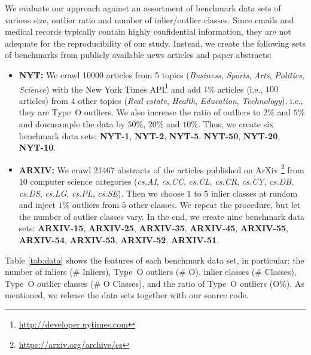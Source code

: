 We evaluate our approach against an assortment of benchmark data sets of various size, outlier ratio and number of inlier/outlier classes. Since emails and medical records typically contain highly confidential information, they are not adequate for the reproducibility of our study. 
Instead, we create the following sets of benchmarks from publicly available news articles and paper abstracts:
\begin{itemize}[leftmargin=*, noitemsep]
    \item \textbf{NYT:} We crawl \num{10000} articles from 5 topics (\textit{Business}, \textit{Sports}, \textit{Arts}, \textit{Politics}, \textit{Science}) with the New York Times API\footnote{\url{http://developer.nytimes.com}} 
    and add $1$\% articles (i.e., $100$ articles) from $4$ other topics (\textit{Real estate}, \textit{Health}, \textit{Education}, \textit{Technology}), i.e., they are Type~O outliers. 
    We also increase the ratio of outliers to $2$\% and $5$\% and downsample the data by $50$\%, $20$\% and $10$\%. Thus, we create six benchmark data sets: \textbf{NYT-1},  \textbf{NYT-2},  \textbf{NYT-5}, \textbf{NYT-50}, \textbf{NYT-20}, \textbf{NYT-10}. 
    \item \textbf{ARXIV:} We crawl \num{21467} abstracts of the articles published on ArXiv \footnote{\url{https://arxiv.org/archive/cs}} 
    from 10 computer science categories (\textit{cs.AI}, \textit{cs.CC}, \textit{cs.CL}, \textit{cs.CR}, \textit{cs.CY}, \textit{cs.DB}, \textit{cs.DS}, \textit{cs.LG}, \textit{cs.PL}, \textit{cs.SE}). Then we choose $1$ to $5$ inlier classes at random and inject $1$\% outliers from $5$ other classes. We repeat the procedure, but let the number of outlier classes vary. In the end, we create nine benchmark data sets: \textbf{ARXIV-15}, \textbf{ARXIV-25}, \textbf{ARXIV-35}, \textbf{ARXIV-45}, \textbf{ARXIV-55}, \textbf{ARXIV-54}, \textbf{ARXIV-53}, \textbf{ARXIV-52}, \textbf{ARXIV-51}. 
\end{itemize}

Table \ref{tab:data} shows the features of each benchmark data set, in particular: the number of inliers (\# Inliers), Type~O outliers (\# O), inlier classes (\# Classes), Type~O outlier classes (\# O Classes), and the ratio of Type~O outliers (O\%). As mentioned, we release the data sets together with our source code.

